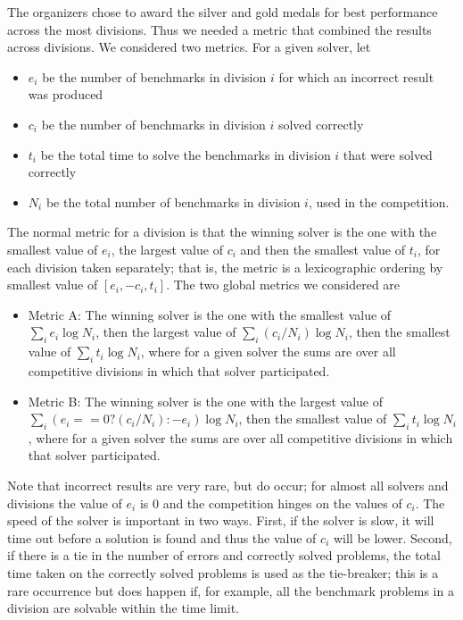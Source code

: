 \documentclass[twoside,11pt]{article}
\begin{document}
The organizers chose to award the silver and gold medals for best performance across the most divisions. Thus we needed a metric that combined the results across divisions. We considered two metrics. For a given solver, let 
\begin{itemize}[noitemsep,nolistsep]
\item $e_i$ be the number of benchmarks in division $i$ for which an incorrect result was produced
\item $c_i$ be the number of benchmarks in division $i$ solved correctly
\item $t_i$ be the total time to solve the benchmarks in division $i$ that were solved correctly
\item $N_i$ be the total number of benchmarks in division $i$, used in the competition.
\end{itemize}
The normal metric for a division is that the winning solver is the one with the
smallest value of $e_i$, the largest value of $c_i$ 
and then the smallest value of $t_i$, for each division taken separately; 
that is, the metric is a lexicographic ordering by smallest value of $[ e_i, -c_i, t_i ]$.
The two global metrics we considered are
\begin{itemize}[noitemsep,nolistsep]
\item Metric A: The winning solver is the one with the smallest value of $\sum_i e_i \log N_i$, then the largest value of $\sum_i (c_i/N_i) \log N_i$, then the smallest value of $\sum_i t_i \log N_i$, where for a given solver the sums are over all competitive divisions in which that solver participated.
\item Metric B: The winning solver is the one with the largest value of $\sum_i (e_i == 0 ? (c_i/N_i) : - e_i ) \log N_i$, then the smallest value of $\sum_i t_i \log N_i$, where for a given solver the sums are over all competitive divisions in which that solver participated.
\end{itemize}
Note that incorrect results are very rare, but do occur; for almost all solvers and divisions the value of $e_i$ is 0 and the competition hinges on the values of $c_i$. The speed of the solver is important in two ways. First, if the solver is slow, it will time out before a solution is found and thus the value of $c_i$ will be lower. Second, if there is a tie in the number of errors and correctly solved problems, the total time taken on the correctly solved problems is used as the tie-breaker; this is a rare occurrence but does happen if, for example, all the benchmark problems in a division are solvable within the time limit.
\end{document}
